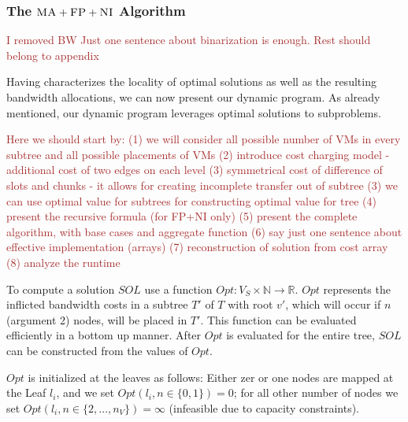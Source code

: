 \documentclass[9pt,twocolumn]{scrartcl}
\newcommand{\maciek}[1]{\textcolor{brown}{#1}}
\newcommand{\ChunkLocation}{\pi}
\newcommand{\SubstrateNodes}{\ensuremath{V_S}}
\newcommand{\SubstrateNode}{\ensuremath{v}}
\newcommand{\Leaf}{\ensuremath{l}}
\newcommand{\Leaves}{\ensuremath{L}}
\newcommand{\Chunks}{\ensuremath{\textsc{chunks}}}
\newcommand{\Opt}{\ensuremath{Opt}}
\newcommand{\Children}{\ensuremath{children}}
\newcommand{\ChunkCount}{\ensuremath{\textsc{cis}}}
\newcommand{\achunk}{\ensuremath{c}}
\newcommand{\CC}{\textsc{NI}}
\newcommand{\FP}{\textsc{FP}}
\newcommand{\MA}{\textsc{MA}}
\newcommand{\Bandwidth}{\ensuremath{bw}}
\newcommand{\Tree}{\ensuremath{T}}
\newcommand{\Vms}{\ensuremath{n_V}}
\newcommand{\Sol}{\ensuremath{SOL}}
\begin{document}
\subsubsection{The $\MA+\FP+\CC$ Algorithm}

\maciek{I removed BW}
\maciek{Just one sentence about binarization is enough. Rest should belong to appendix}

Having characterizes the locality of optimal solutions as well as the resulting
bandwidth allocations, we can now present our dynamic program.
As already mentioned, our dynamic program leverages optimal solutions to
subproblems.

\maciek{Here we should start by: (1) we will consider all possible number of VMs in every subtree and all possible placements of VMs
  (2) introduce cost charging model - additional cost of two edges on each level (3) symmetrical cost of difference of slots and chunks - it allows for creating incomplete transfer out of subtree (3) we can use optimal value for subtrees for constructing optimal value for tree (4) present the recursive formula (for FP+NI only) (5) present the complete algorithm, with base cases and aggregate function (6) say just one sentence about effective implementation (arrays) (7) reconstruction of solution from cost array (8) analyze the runtime}

To compute a solution $\Sol$ use a
function $\Opt : \SubstrateNodes \times \mathbb{N} \rightarrow \mathbb{R}$.
$\Opt$ represents the inflicted bandwidth costs in a subtree $\Tree'$ of $\Tree$ 
with root $\SubstrateNode'$, which will occur if $n$ (argument 2)
nodes, will be placed in $\Tree'$.
This
function can be evaluated
efficiently in a bottom up manner. After $\Opt$ is evaluated for the entire
tree, $\Sol$ can be constructed from the values of $\Opt$.

$\Opt$ is initialized at the leaves as follows:
Either zer or one nodes are mapped at the Leaf $\Leaf_i$, 
and we set $\Opt(\Leaf_i, n \in
\{0,1\}) = 0$; for all other number of nodes we set $\Opt(\Leaf_i, n \in
\{2,\dots,\Vms\}) = \infty$ (infeasible due to capacity constraints).
\end{document}

